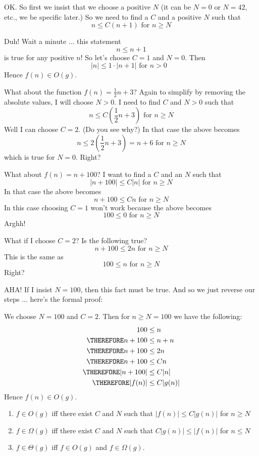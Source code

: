 OK. So first we insist that we choose a positive $N$ (it can be $N = 0$ or $N = 42$, etc., we be specific later.) So we need to find a $C$ and a positive $N$ such that
\[
\text{$n \leq C(n+1)$ for $n \geq N$}
\]

Duh! Wait a minute ... this statement
\[
\text{$n \leq n+1$}
\]
is true for any positive $n$! So let's choose $C = 1$ and $N = 0$. Then
\[
|n| \leq 1 \cdot |n+1| \text{ for $n > 0$ } 
\]
Hence $f(n) \in O(g)$.

What about the function $f(n) = \frac{1}{2} n + 3$? Again to simplify by removing the absolute values, I will choose $N > 0$. I need to find $C$ and $N > 0$ such that 
\[
\text{$n \leq C \left( \frac{1}{2} n + 3 \right)$ for $n \geq N$}
\]
Well I can choose $C = 2$. (Do you see why?) In that case the above becomes
\[
\text{$n \leq 2 \left( \frac{1}{2} n + 3 \right) = n + 6$ for $n \geq N$}
\]
which is true for $N = 0$. Right?

What about $f(n) = n + 100$? I want to find a $C$ and an $N$ such that
\[
\text{$|n + 100| \leq C|n|$ for $n \geq N$}
\]
In that case the above becomes
\[
\text{$n + 100 \leq Cn$ for $n \geq N$}
\]
In this case choosing $C = 1$ won't work because the above becomes
\[
\text{$100 \leq 0$ for $n \geq N$}
\]
Arghh!

What if I choose $C = 2$? Is the following true?
\[
\text{$n + 100 \leq 2n$ for $n \geq N$}
\]
This is the same as
\[
\text{$100 \leq n$ for $n \geq N$}
\]
Right? 

AHA! If I insist $N = 100$, then this fact must be true. And so we just reverse our steps ... here's the formal proof:

We choose $N = 100$ and $C = 2$. Then for $n \geq N = 100$
we have the following:
\begin{align*}
100 &\leq n \\
\THEREFORE n + 100 &\leq n + n \\
\THEREFORE n + 100 &\leq 2n \\
\THEREFORE n + 100 &\leq Cn \\
\THEREFORE |n + 100| &\leq C|n| \\
\THEREFORE |f(n)| &\leq C|g(n)|
\end{align*}
Hence $f(n) \in O(g)$.
 
\begin{enumerate}
 \item $f \in O(g)$ iff there exist $C$ and $N$ such that $|f(n)| \leq C|g(n)|$ for $n \geq
 N$
 \item $f \in \Omega(g)$ iff there exist $C$ and $N$ such that $C|g(n)| \leq |f(n)|$ for $n \leq N$
 \item $f \in \Theta(g)$ iff $f \in O(g)$ and $f \in \Omega(g)$.
\end{enumerate}

